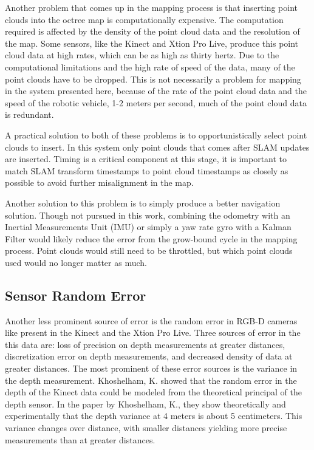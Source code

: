\documentclass[12pt]{report}
\begin{document}
Another problem that comes up in the mapping process is that inserting point clouds into the octree map is computationally expensive.  The computation required is affected by the density of the point cloud data and the resolution of the map.  Some sensors, like the Kinect and Xtion Pro Live, produce this point cloud data at high rates, which can be as high as thirty hertz.  Due to the computational limitations and the high rate of speed of the data, many of the point clouds have to be dropped.  This is not necessarily a problem for mapping in the system presented here, because of the rate of the point cloud data and the speed of the robotic vehicle, 1-2 meters per second, much of the point cloud data is redundant.

A practical solution to both of these problems is to opportunistically select point clouds to insert.  In this system only point clouds that comes after SLAM updates are inserted.  Timing is a critical component at this stage, it is important to match SLAM transform timestamps to point cloud timestamps as closely as possible to avoid further misalignment in the map.


Another solution to this problem is to simply produce a better navigation solution.  Though not pursued in this work, combining the odometry with an Inertial Measurements Unit (IMU) or simply a yaw rate gyro with a Kalman Filter would likely reduce the error from the grow-bound cycle in the mapping process.  Point clouds would still need to be throttled, but which point clouds used would no longer matter as much.

\subsection{Sensor Random Error}
Another less prominent source of error is the random error in RGB-D cameras like present in the Kinect and the Xtion Pro Live.  Three sources of error in the this data are: loss of precision on depth measurements at greater distances, discretization error on depth measurements, and decreased density of data at greater distances.  The most prominent of these error sources is the variance in the depth measurement.  Khoshelham, K. showed that the random error in the depth of the Kinect data could be modeled from the theoretical principal of the depth sensor\cite{khoshelham2011accuracy}.  In the paper by Khoshelham, K., they show theoretically and experimentally that the depth variance at 4 meters is about 5 centimeters.  This variance changes over distance, with smaller distances yielding more precise measurements than at greater distances.
\end{document}
